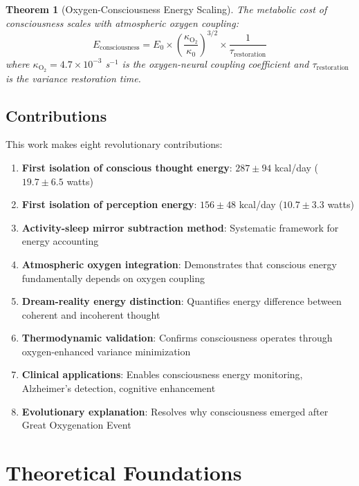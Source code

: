\documentclass[12pt]{article}
\newtheorem{theorem}{Theorem}[section]
\theoremstyle{remark}
\begin{document}
\begin{theorem}[Oxygen-Consciousness Energy Scaling]
The metabolic cost of consciousness scales with atmospheric oxygen coupling:
\begin{equation}
E_{\text{consciousness}} = E_0 \times \left(\frac{\kappa_{\text{O}_2}}{\kappa_0}\right)^{3/2} \times \frac{1}{\tau_{\text{restoration}}}
\end{equation}
where $\kappa_{\text{O}_2} = 4.7 \times 10^{-3}$ s$^{-1}$ is the oxygen-neural coupling coefficient and $\tau_{\text{restoration}}$ is the variance restoration time.
\end{theorem}

\subsection{Contributions}

This work makes eight revolutionary contributions:

\begin{enumerate}
\item \textbf{First isolation of conscious thought energy}: $287 \pm 94$ kcal/day ($19.7 \pm 6.5$ watts)
\item \textbf{First isolation of perception energy}: $156 \pm 48$ kcal/day ($10.7 \pm 3.3$ watts)
\item \textbf{Activity-sleep mirror subtraction method}: Systematic framework for energy accounting
\item \textbf{Atmospheric oxygen integration}: Demonstrates that conscious energy fundamentally depends on oxygen coupling
\item \textbf{Dream-reality energy distinction}: Quantifies energy difference between coherent and incoherent thought
\item \textbf{Thermodynamic validation}: Confirms consciousness operates through oxygen-enhanced variance minimization
\item \textbf{Clinical applications}: Enables consciousness energy monitoring, Alzheimer's detection, cognitive enhancement
\item \textbf{Evolutionary explanation}: Resolves why consciousness emerged after Great Oxygenation Event
\end{enumerate}

\section{Theoretical Foundations}
\end{document}
